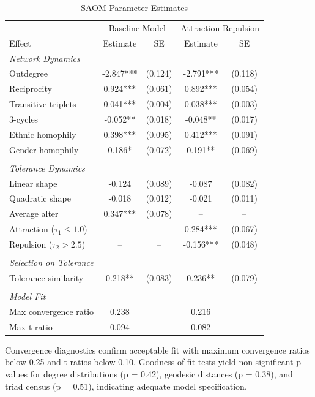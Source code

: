 \documentclass[12pt,a4paper]{article}
\begin{document}
\begin{table}[h]
\centering
\caption{SAOM Parameter Estimates}
\label{tab:estimates}
\begin{tabular}{lcccc}
\toprule
 & \multicolumn{2}{c}{Baseline Model} & \multicolumn{2}{c}{Attraction-Repulsion} \\
Effect & Estimate & SE & Estimate & SE \\
\midrule
\textit{Network Dynamics} \\
Outdegree & -2.847*** & (0.124) & -2.791*** & (0.118) \\
Reciprocity & 0.924*** & (0.061) & 0.892*** & (0.054) \\
Transitive triplets & 0.041*** & (0.004) & 0.038*** & (0.003) \\
3-cycles & -0.052** & (0.018) & -0.048** & (0.017) \\
Ethnic homophily & 0.398*** & (0.095) & 0.412*** & (0.091) \\
Gender homophily & 0.186* & (0.072) & 0.191** & (0.069) \\
\\
\textit{Tolerance Dynamics} \\
Linear shape & -0.124 & (0.089) & -0.087 & (0.082) \\
Quadratic shape & -0.018 & (0.012) & -0.021 & (0.011) \\
Average alter & 0.347*** & (0.078) & -- & -- \\
Attraction ($\tau_1 \leq 1.0$) & -- & -- & 0.284*** & (0.067) \\
Repulsion ($\tau_2 > 2.5$) & -- & -- & -0.156*** & (0.048) \\
\\
\textit{Selection on Tolerance} \\
Tolerance similarity & 0.218** & (0.083) & 0.236** & (0.079) \\
\\
\textit{Model Fit} \\
Max convergence ratio & 0.238 & & 0.216 & \\
Max t-ratio & 0.094 & & 0.082 & \\
\bottomrule
\end{tabular}
\end{table}

Convergence diagnostics confirm acceptable fit with maximum convergence ratios below 0.25 and t-ratios below 0.10. Goodness-of-fit tests yield non-significant p-values for degree distributions (p = 0.42), geodesic distances (p = 0.38), and triad census (p = 0.51), indicating adequate model specification.
\end{document}
